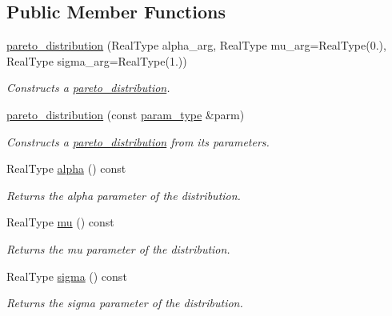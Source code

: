 \subsection*{Public Member Functions}
\begin{DoxyCompactItemize}
\item 
\mbox{\hyperlink{classpareto__distribution_a667f195859ce355378510b79c2a6e6ee}{pareto\+\_\+distribution}} (Real\+Type alpha\+\_\+arg, Real\+Type mu\+\_\+arg=Real\+Type(0.), Real\+Type sigma\+\_\+arg=Real\+Type(1.))
\begin{DoxyCompactList}\small\item\em Constructs a \mbox{\hyperlink{classpareto__distribution}{pareto\+\_\+distribution}}. \end{DoxyCompactList}\item 
\mbox{\label{classpareto__distribution_ad08df2fa3ced8fec377e35fa9ded260b}} 
\mbox{\hyperlink{classpareto__distribution_ad08df2fa3ced8fec377e35fa9ded260b}{pareto\+\_\+distribution}} (const \mbox{\hyperlink{classpareto__distribution_1_1param__type}{param\+\_\+type}} \&parm)
\begin{DoxyCompactList}\small\item\em Constructs a \mbox{\hyperlink{classpareto__distribution}{pareto\+\_\+distribution}} from its parameters. \end{DoxyCompactList}\item 
Real\+Type \mbox{\hyperlink{classpareto__distribution_a4e867e8f34f77a9953873987374fb5d0}{alpha}} () const
\begin{DoxyCompactList}\small\item\em Returns the alpha parameter of the distribution. \end{DoxyCompactList}\item 
Real\+Type \mbox{\hyperlink{classpareto__distribution_ab4fd822cde4f415efa8e0bc6ce7c2bad}{mu}} () const
\begin{DoxyCompactList}\small\item\em Returns the mu parameter of the distribution. \end{DoxyCompactList}\item 
Real\+Type \mbox{\hyperlink{classpareto__distribution_a739d59031c3fd72af690ec68c1073afc}{sigma}} () const
\begin{DoxyCompactList}\small\item\em Returns the sigma parameter of the distribution. \end{DoxyCompactList}\item 

\end{DoxyCompactItemize}
